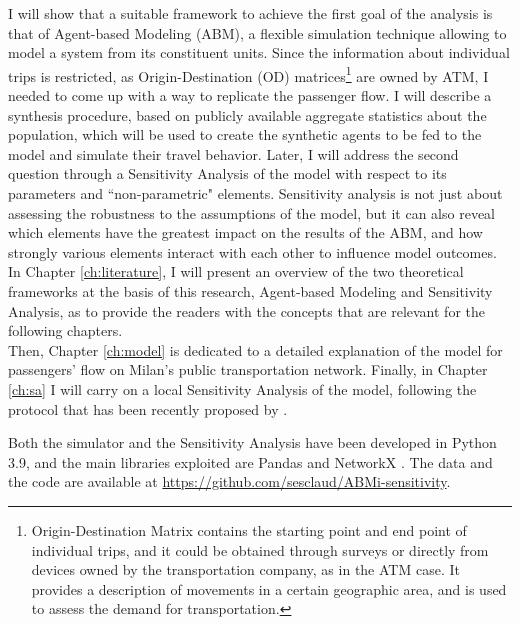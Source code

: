 I will show that a suitable framework to achieve the first goal of the analysis is that of Agent-based Modeling (ABM), a flexible simulation technique allowing to model a system from its constituent units. Since the information about individual trips is restricted, as Origin-Destination (OD) matrices\footnote{Origin-Destination Matrix contains the starting point and end point of individual trips, and it could be obtained through surveys or directly from devices owned by the transportation company, as in the ATM case. It provides a description of movements in a certain geographic area, and is used to assess the demand for transportation.} are owned by ATM, I needed to come up with a way to replicate the passenger flow. I will describe a synthesis procedure, based on publicly available aggregate statistics about the population, which will be used to create the synthetic agents to be fed to the model and simulate their travel behavior. Later, I will address the second question through a Sensitivity Analysis of the model with respect to its parameters and ``non-parametric" elements. Sensitivity analysis is not just about assessing the robustness to the assumptions of the model, but it can also reveal which elements have the greatest impact on the results of the ABM, and how strongly various elements interact with each other to influence model outcomes.\\ 

In Chapter \ref{ch:literature}, I will present an overview of the two theoretical frameworks at the basis of this research, Agent-based Modeling and Sensitivity Analysis, as to provide the readers with the concepts that are relevant for the following chapters. \\ Then, Chapter \ref{ch:model} is dedicated to a detailed explanation of the model for passengers' flow on Milan's public transportation network. Finally, in Chapter \ref{ch:sa} I will carry on a local Sensitivity Analysis of the model, following the protocol that has been recently proposed by \textcite{Borgonovo2022SensitivityAO}.

Both the simulator and the Sensitivity Analysis have been developed in Python 3.9, and the main libraries exploited are Pandas \cite{mckinney-proc-scipy-2010} and NetworkX \cite{SciPyProceedings_11}. The data and the code are available at \url{https://github.com/sesclaud/ABMi-sensitivity}.